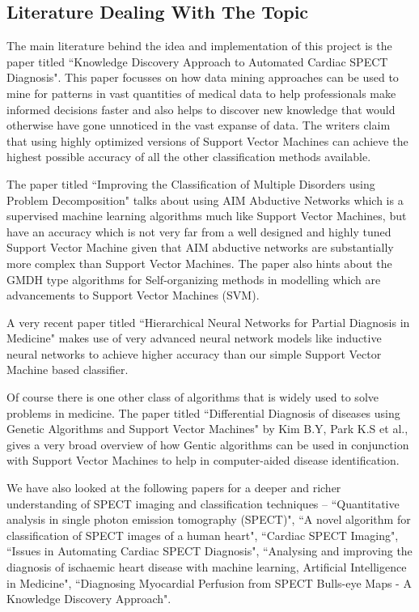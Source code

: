 \documentclass{acm_proc_article-sp}
\begin{document}
\subsection{Literature Dealing With The Topic}

The main literature behind the idea and implementation of this project is the paper titled ``Knowledge Discovery Approach to Automated Cardiac SPECT Diagnosis"\cite{KD}. This paper focusses on how data mining approaches can be used to mine for patterns in vast quantities of medical data to help professionals make informed decisions faster and also helps to discover new knowledge that would otherwise have gone unnoticed in the vast expanse of data. The writers claim that using highly optimized versions of Support Vector Machines can achieve the highest possible accuracy of all the other classification methods available. 

The paper titled ``Improving the Classification of Multiple Disorders using Problem Decomposition"\cite{CM} talks about using AIM Abductive Networks which is a supervised machine learning algorithms much like Support Vector Machines, but have an accuracy which is not very far from a well designed and highly tuned Support Vector Machine given that AIM abductive networks are substantially more complex than Support Vector Machines. The paper also hints about the GMDH type algorithms for Self-organizing methods in modelling which are advancements to Support Vector Machines (SVM).

A very recent paper titled ``Hierarchical Neural Networks for Partial Diagnosis in Medicine"\cite{HN} makes use of very advanced neural network models like inductive neural networks to achieve higher accuracy than our simple Support Vector Machine based classifier.

Of course there is one other class of algorithms that is widely used to solve problems in medicine. The paper titled ``Differential Diagnosis of diseases using Genetic Algorithms and Support Vector Machines" by Kim B.Y, Park K.S et al., gives a very broad overview of how Gentic algorithms can be used in conjunction with Support Vector Machines to help in computer-aided disease identification.

We have also looked at the following papers for a deeper and richer understanding of SPECT imaging and classification techniques -- ``Quantitative analysis in single photon emission tomography (SPECT)"\cite{QA}, ``A novel algorithm for classification of SPECT images of a human heart"\cite{NA}, ``Cardiac SPECT Imaging"\cite{CS}, ``Issues in Automating Cardiac SPECT Diagnosis"\cite{IS}, ``Analysing and improving the diagnosis of ischaemic heart disease with machine learning, Artificial Intelligence in Medicine"\cite{AI}, ``Diagnosing Myocardial Perfusion from SPECT Bulls-eye Maps - A Knowledge Discovery Approach"\cite{DM}.
\end{document}
